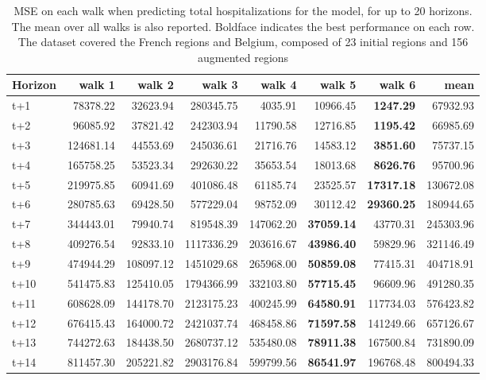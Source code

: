 \begin{table}[H]
\centering
\caption{MSE on each walk when predicting total hospitalizations for the model, for up to 20 horizons. The mean over all walks is also reported. Boldface indicates the best performance on each row. The dataset covered the French regions and Belgium, composed of 23 initial regions and 156 augmented regions }
\label{tab:MSE_walk_encoder_decoder}
\begin{tabular}{lrrrrrrr}
\toprule
Horizon &     walk 1 &    walk 2 &     walk 3 &    walk 4 &    walk 5 &    walk 6 &       mean \\
\midrule
t+1  & 78378.22  & 32623.94  & 280345.75  & 4035.91  & 10966.45  & \textbf{1247.29}  & 67932.93  \\
t+2  & 96085.92  & 37821.42  & 242303.94  & 11790.58  & 12716.85  & \textbf{1195.42}  & 66985.69  \\
t+3  & 124681.14  & 44553.69  & 245036.61  & 21716.76  & 14583.12  & \textbf{3851.60}  & 75737.15  \\
t+4  & 165758.25  & 53523.34  & 292630.22  & 35653.54  & 18013.68  & \textbf{8626.76}  & 95700.96  \\
t+5  & 219975.85  & 60941.69  & 401086.48  & 61185.74  & 23525.57  & \textbf{17317.18}  & 130672.08  \\
t+6  & 280785.63  & 69428.50  & 577229.04  & 98752.09  & 30112.42  & \textbf{29360.25}  & 180944.65  \\
t+7  & 344443.01  & 79940.74  & 819548.39  & 147062.20  & \textbf{37059.14}  & 43770.31  & 245303.96  \\
t+8  & 409276.54  & 92833.10  & 1117336.29  & 203616.67  & \textbf{43986.40}  & 59829.96  & 321146.49  \\
t+9  & 474944.29  & 108097.12  & 1451029.68  & 265968.00  & \textbf{50859.08}  & 77415.31  & 404718.91  \\
t+10  & 541475.83  & 125410.05  & 1794366.99  & 332103.80  & \textbf{57715.45}  & 96609.96  & 491280.35  \\
t+11  & 608628.09  & 144178.70  & 2123175.23  & 400245.99  & \textbf{64580.91}  & 117734.03  & 576423.82  \\
t+12  & 676415.43  & 164000.72  & 2421037.74  & 468458.86  & \textbf{71597.58}  & 141249.66  & 657126.67  \\
t+13  & 744272.63  & 184438.50  & 2680737.12  & 535480.08  & \textbf{78911.38}  & 167500.84  & 731890.09  \\
t+14  & 811457.30  & 205221.82  & 2903176.84  & 599799.56  & \textbf{86541.97}  & 196768.48  & 800494.33  \\

\end{tabular}
\end{table}
